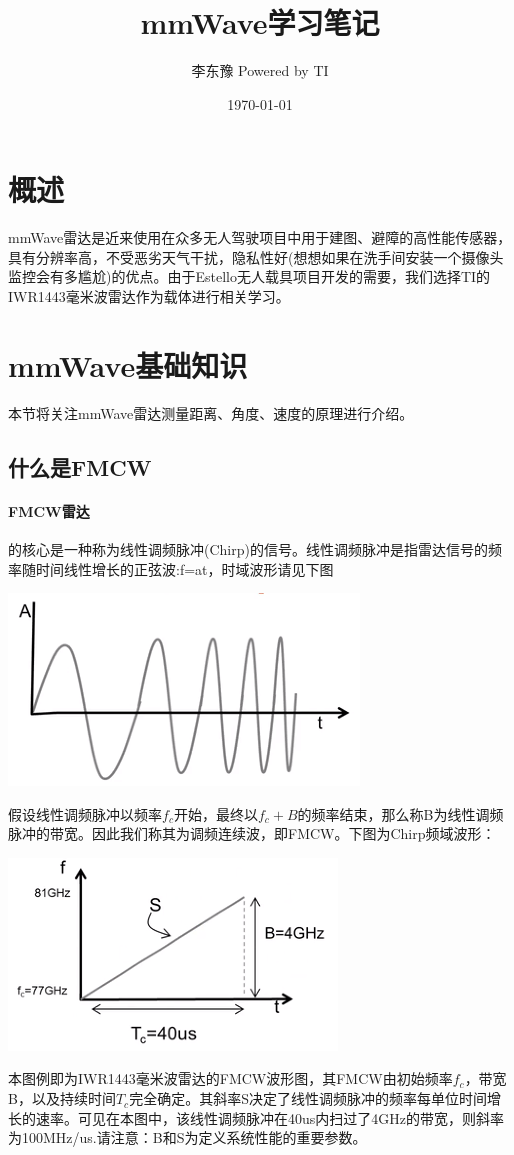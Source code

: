 \documentclass[UTF8]{ctexart}
\title{mmWave学习笔记}
\author{李东豫  Powered by TI}
\date{\today}
\begin{document}
\maketitle
\tableofcontents
\section{概述}
mmWave雷达是近来使用在众多无人驾驶项目中用于建图、避障的高性能传感器，具有分辨率高，不受恶劣天气干扰，隐私性好(想想如果在洗手间安装一个摄像头监控会有多尴尬)的优点。由于Estello无人载具项目开发的需要，我们选择TI的IWR1443毫米波雷达作为载体进行相关学习。
\section{mmWave基础知识}
本节将关注mmWave雷达测量距离、角度、速度的原理进行介绍。
\subsection{什么是FMCW}
\paragraph{FMCW雷达}
的核心是一种称为线性调频脉冲(Chirp)的信号。线性调频脉冲是指雷达信号的频率随时间线性增长的正弦波:f=at，时域波形请见下图\\
{\centering \includegraphics[width = .4\textwidth]{pic/FMCW.png}

}

假设线性调频脉冲以频率$f_c$开始，最终以$f_c+B$的频率结束，那么称B为线性调频脉冲的带宽。因此我们称其为调频连续波，即FMCW。下图为Chirp频域波形：

{\centering \includegraphics[width = .4\textwidth]{pic/FMCW_Fwave.png}

}

本图例即为IWR1443毫米波雷达的FMCW波形图，其FMCW由初始频率$f_c$，带宽B，以及持续时间$T_c$完全确定。其斜率S决定了线性调频脉冲的频率每单位时间增长的速率。可见在本图中，该线性调频脉冲在40us内扫过了4GHz的带宽，则斜率为100MHz/us.请注意：B和S为定义系统性能的重要参数。
\end{document}

